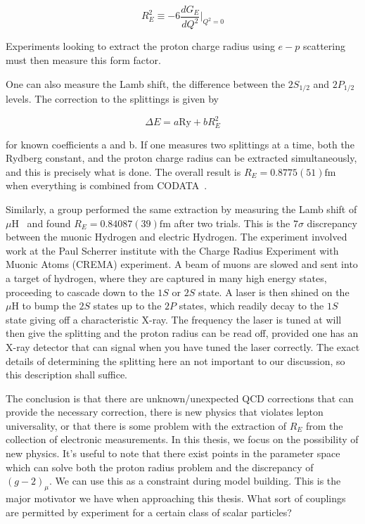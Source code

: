 \begin{equation}
    R_E^2 \equiv -6 \frac{d G_E}{d Q^2}\rvert_{Q^2=0}
\end{equation}

\noindent Experiments looking to extract the proton charge radius using $e-p$ scattering must then measure this form factor.

One can also measure the Lamb shift, the difference between the $2S_{1/2}$ and $2P_{1/2}$ levels.
The correction to the splittings is given by

\begin{equation}
    \Delta E = a \textrm{Ry} + b R_E^2
\end{equation}

\noindent for known coefficients a and b. If one measures two splittings at a time, both the Rydberg constant, and the proton charge radius can be extracted simultaneously, and this is precisely what is done.
The overall result is $R_E = 0.8775(51)\textrm{fm}$ when everything is combined from CODATA~\cite{Mohr:2012tt}.

Similarly, a group performed the same extraction by measuring the Lamb shift of $\mu\textrm{H}$~\cite{Pohl:2010zza,Antognini:1900ns} and found $R_E = 0.84087(39)\textrm{fm}$ after two trials.
This is the $7\sigma$ discrepancy between the muonic Hydrogen and electric Hydrogen.
The experiment involved work at the Paul Scherrer institute with the Charge Radius Experiment with Muonic Atoms (CREMA) experiment.
A beam of muons are slowed and sent into a target of hydrogen, where they are captured in many high energy states, proceeding to cascade down to the $1S$ or $2S$ state.
A laser is then shined on the $\mu\textrm{H}$ to bump the $2S$ states up to the $2P$ states, which readily decay to the $1S$ state giving off a characteristic X-ray.
The frequency the laser is tuned at will then give the splitting and the proton radius can be read off, provided one has an X-ray detector that can signal when you have tuned the laser correctly.
The exact details of determining the splitting here an not important to our discussion, so this description shall suffice.

The conclusion is that there are unknown/unexpected QCD corrections that can provide the necessary correction, there is new physics that violates lepton universality, or that there is some problem with the extraction of $R_E$ from the collection of electronic measurements.
In this thesis, we focus on the possibility of new physics.
It's useful to note that there exist points in the parameter space which can solve both the proton radius problem and the discrepancy of $(g-2)_\mu$.
We can use this as a constraint during model building.
This is the major motivator we have when approaching this thesis.
What sort of couplings are permitted by experiment for a certain class of scalar particles?
